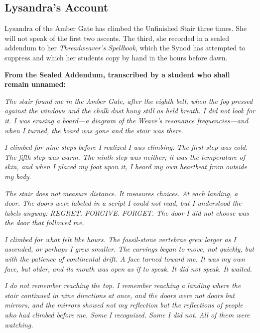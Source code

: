 \documentclass[10pt,twocolumn]{book}
\begin{document}
\subsection{Lysandra's Account}

Lysandra of the Amber Gate has climbed the Unfinished Stair three times. She will not speak of the first two ascents. The third, she recorded in a sealed addendum to her \textit{Threadweaver's Spellbook}, which the Synod has attempted to suppress and which her students copy by hand in the hours before dawn.

\begin{tcolorbox}[colback=black!5,colframe=black!30,width=\linewidth,arc=2mm,auto outer arc,boxrule=0.5pt,left=0.5cm,right=0.5cm,fontupper=\itshape,breakable]
\textbf{From the Sealed Addendum, transcribed by a student who shall remain unnamed:}

\textit{The stair found me in the Amber Gate, after the eighth bell, when the fog pressed against the windows and the chalk dust hung still as held breath. I did not look for it. I was erasing a board---a diagram of the Weave's resonance frequencies---and when I turned, the board was gone and the stair was there.}

\textit{I climbed for nine steps before I realized I was climbing. The first step was cold. The fifth step was warm. The ninth step was neither; it was the temperature of skin, and when I placed my foot upon it, I heard my own heartbeat from outside my body.}

\textit{The stair does not measure distance. It measures choices. At each landing, a door. The doors were labeled in a script I could not read, but I understood the labels anyway: REGRET. FORGIVE. FORGET. The door I did not choose was the door that followed me.}

\textit{I climbed for what felt like hours. The fossil-stone vertebrae grew larger as I ascended, or perhaps I grew smaller. The carvings began to move, not quickly, but with the patience of continental drift. A face turned toward me. It was my own face, but older, and its mouth was open as if to speak. It did not speak. It waited.}

\textit{I do not remember reaching the top. I remember reaching a landing where the stair continued in nine directions at once, and the doors were not doors but mirrors, and the mirrors showed not my reflection but the reflections of people who had climbed before me. Some I recognized. Some I did not. All of them were watching.}


\end{tcolorbox}
\end{document}
